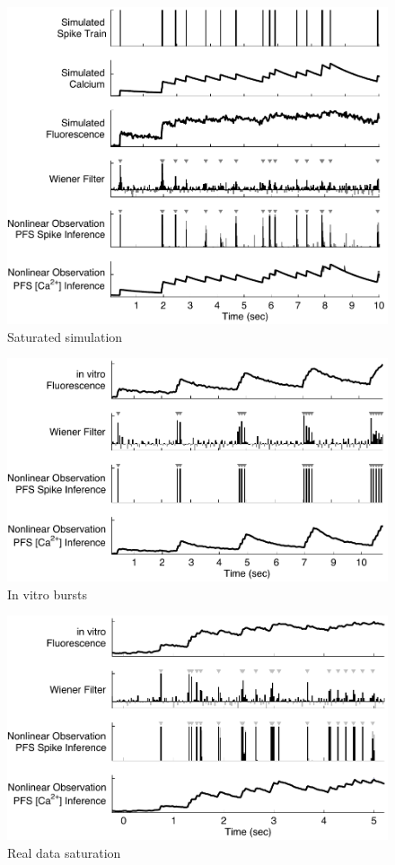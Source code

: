 \documentclass[10pt]{article}
\begin{document}
\clearpage \newpage
\begin{figure}
\includegraphics[width=1.0\linewidth]{SaturSim_bw}
\caption{Saturated simulation} \label{fig:SaturSim}
\end{figure}

\clearpage \newpage
\begin{figure}
\includegraphics[width=1.0\linewidth]{BurstData_bw}
\caption{In vitro bursts} \label{fig:BurstData}
\end{figure}

\clearpage \newpage
\begin{figure}
\includegraphics[width=1.0\linewidth]{SaturData_bw}
\caption{Real data saturation} \label{fig:SaturData}
\end{figure}
\end{document}

